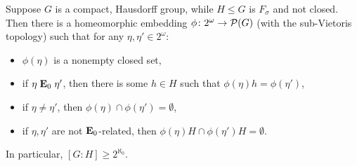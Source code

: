 	\begin{cor}
		\label{cor:Vietoris_embed}
		Suppose $G$ is a compact, Hausdorff group, while $H\leq G$ is $F_\sigma$ and not closed. Then there is a homeomorphic embedding $\phi\colon 2^\omega\to {\mathcal P}(G)$ (with the sub-Vietoris topology) such that for any $\eta,\eta'\in 2^\omega$:
		\begin{itemize}
			\item
			$\phi(\eta)$ is a nonempty closed set,
			\item
			if $\eta \mathrel{ { {\mathbf E}_0 } } \eta'$, then there is some $h\in H$ such that $\phi(\eta)h=\phi(\eta')$,
			\item
			if $\eta\neq \eta'$, then $\phi(\eta)\cap \phi(\eta')=\emptyset$,
			\item
			if $\eta,\eta'$ are not $\mathrel{ { {\mathbf E}_0 } }$-related, then $\phi(\eta)H\cap \phi(\eta')H=\emptyset$.
		\end{itemize}
		In particular, $[G:H]\geq 2^{\aleph_0}$.
	\end{cor}
